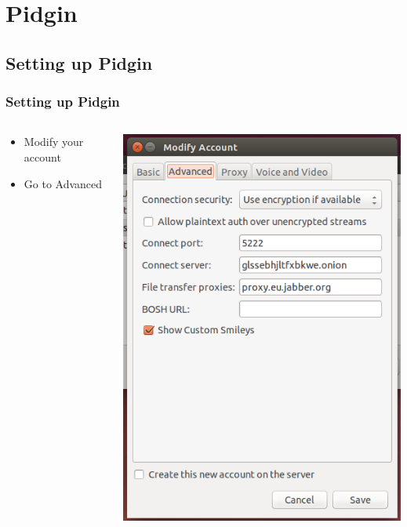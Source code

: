 \documentclass{beamer}
\begin{document}
\section{Pidgin}
\subsection{Setting up Pidgin}
\begin{frame}
\frametitle{Setting up Pidgin}
\begin{columns}
    \begin{column}{0.48\textwidth}
        \begin{itemize}
          \item Modify your account
          \item Go to Advanced
        \end{itemize}
    \end{column}
    \begin{column}{.5\textwidth}
        \includegraphics[width=.9\linewidth]{pidgin_advanced}
    \end{column}
\end{columns}
\end{frame}
\end{document}
